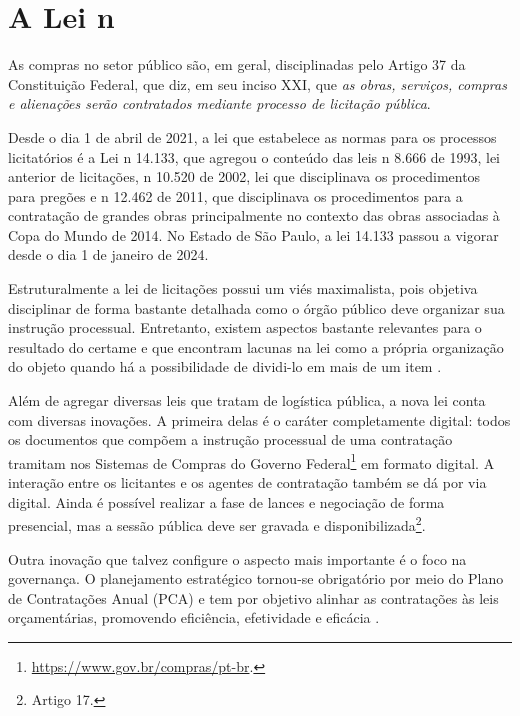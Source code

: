 \chapter{A Lei n}
\label{cap:14133}

As compras no setor público são, em geral, disciplinadas pelo Artigo 37 da Constituição Federal, que diz, em seu inciso XXI, que \emph{as obras, serviços, compras e alienações serão contratados mediante processo de licitação pública}.

Desde o dia 1{\textordmasculine} de abril de 2021, a lei que estabelece as normas para os processos licitatórios é a Lei n{\textordmasculine} 14.133, que agregou o conteúdo das leis n{\textordmasculine} 8.666 de 1993, lei anterior de licitações, n{\textordmasculine} 10.520 de 2002, lei que disciplinava os procedimentos para pregões e n{\textordmasculine} 12.462 de 2011, que disciplinava os procedimentos para a contratação de grandes obras principalmente no contexto das obras associadas à Copa do Mundo de 2014. No Estado de São Paulo, a lei 14.133 passou a vigorar desde o dia 1{\textordmasculine} de janeiro de 2024.

Estruturalmente a lei de licitações possui um viés maximalista, pois objetiva disciplinar de forma bastante detalhada como o órgão público deve organizar sua instrução processual. Entretanto, existem aspectos bastante relevantes para o resultado do certame e que encontram lacunas na lei como a própria organização do objeto quando há a possibilidade de dividi-lo em mais de um item \citet{pellegrini2018:MSc}.

Além de agregar diversas leis que tratam de logística pública, a nova lei conta com diversas inovações. A primeira delas é o caráter completamente digital: todos os documentos que compõem a instrução processual de uma contratação tramitam nos Sistemas de Compras do Governo Federal\footnote{\url{https://www.gov.br/compras/pt-br}.} em formato digital. A interação entre os licitantes e os agentes de contratação também se dá por via digital. Ainda é possível realizar a fase de lances e negociação de forma presencial, mas a sessão pública deve ser gravada e disponibilizada\footnote{Artigo 17.}.

Outra inovação que talvez configure o aspecto mais importante é o foco na governança. O planejamento estratégico tornou-se obrigatório por meio do Plano de Contratações Anual (PCA) e tem por objetivo alinhar as contratações às leis orçamentárias, promovendo eficiência, efetividade e eficácia \citet{TCE2022}.

